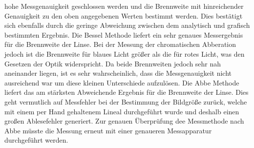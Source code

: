hohe Messgenauigkeit geschlossen werden und die Brennweite mit hinreichender Genauigkeit zu den oben angegebenen Werten bestimmt werden. Dies bestätigt sich
ebenfalls durch die geringe Abweichung zwischen dem analytisch und grafisch bestimmten Ergebnis.
Die Bessel Methode liefert ein sehr genaues Messergebnis für die Brennweite der Linse. Bei der Messung der chromatischen Abberation jedoch ist die Brennweite für
blaues Licht größer als die für rotes Licht, was den Gesetzen der Optik widerspricht. Da beide Brennweiten jedoch sehr nah aneinander liegen, ist es sehr wahrscheinlich,
dass die Messgenauigkeit nicht ausreichend war um diese kleinen Unterschiede aufzulösen.
Die Abbe Methode liefert das am stärksten Abweichende Ergebnis für die Brennweite der Linse. Dies geht vermutlich auf Messfehler bei der Bestimmung der Bildgröße
zurück, welche mit einem per Hand gehaltenem Lineal durchgeführt wurde und deshalb einen großen Ablesefehler generiert. Zur genauen Überprüfung dee Messmethode nach Abbe
müsste die Messung erneut mit einer genaueren Messapparatur durchgeführt werden.
